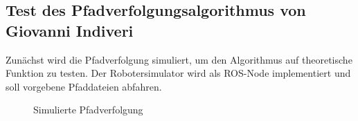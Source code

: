 \documentclass[11pt,a4paper]{article}
\begin{document}
{\subsection{Test des Pfadverfolgungsalgorithmus von Giovanni Indiveri}


Zun\"achst wird die Pfadverfolgung simuliert, um den Algorithmus auf theoretische Funktion zu testen. Der Robotersimulator wird als ROS-Node implementiert und soll vorgebene Pfaddateien abfahren.

\begin{figure}[h]
	\caption{Simulierte Pfadverfolgung}


\end{figure}}
\end{document}
